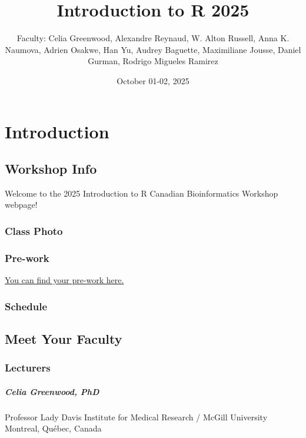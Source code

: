 \documentclass[
]{book}
\title{Introduction to R 2025}
\author{Faculty: Celia Greenwood, Alexandre Reynaud, W. Alton Russell, Anna K. Naumova, Adrien Osakwe, Han Yu, Audrey Baguette, Maximiliane Jousse, Daniel Gurman, Rodrigo Migueles Ramirez}
\date{October 01-02, 2025}
\begin{document}
\maketitle

{
\setcounter{tocdepth}{1}
\tableofcontents
}
\part{Introduction}\label{part-introduction}

\chapter{Workshop Info}\label{workshop-info}

Welcome to the 2025 Introduction to R Canadian Bioinformatics Workshop webpage!

\section{Class Photo}\label{class-photo}

\section{Pre-work}\label{pre-work}

\href{https://docs.google.com/forms/d/e/1FAIpQLSdqzz503MPixGxHCbMSvXJCsZyQ8yWG9g1NIO2SexwJL9JUzw/viewform?usp=share_link&ouid=101140812887781190012}{You can find your pre-work here.}

\section{Schedule}\label{schedule}

\chapter{Meet Your Faculty}\label{meet-your-faculty}

\section{Lecturers}\label{lecturers}

\subsubsection{Celia Greenwood, PhD}\label{celia-greenwood-phd}

Professor
Lady Davis Institute for Medical Research / McGill University
Montreal, Québec, Canada
\end{document}
